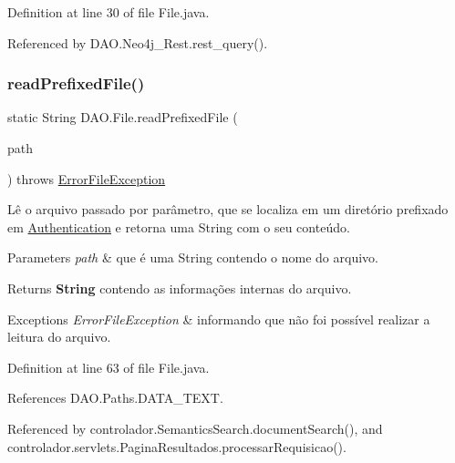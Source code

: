 Definition at line 30 of file File.\+java.



Referenced by D\+A\+O.\+Neo4j\+\_\+\+Rest.\+rest\+\_\+query().

\hypertarget{classDAO_1_1File_ae6b4d0d0dc80f0e783e78bee62c3f7fe}{}\label{classDAO_1_1File_ae6b4d0d0dc80f0e783e78bee62c3f7fe} 
\subsubsection{\texorpdfstring{read\+Prefixed\+File()}{readPrefixedFile()}}
{\footnotesize\ttfamily static String D\+A\+O.\+File.\+read\+Prefixed\+File (\begin{DoxyParamCaption}\item[{String}]{path }\end{DoxyParamCaption}) throws \hyperlink{classexcessao_1_1ErrorFileException}{Error\+File\+Exception}\hspace{0.3cm}{\ttfamily [static]}}

Lê o arquivo passado por parâmetro, que se localiza em um diretório prefixado em \hyperlink{enumDAO_1_1Authentication}{Authentication} e retorna uma String com o seu conteúdo.


\begin{DoxyParams}{Parameters}
{\em path} & que é uma String contendo o nome do arquivo. \\
\hline
\end{DoxyParams}
\begin{DoxyReturn}{Returns}
{\bfseries String} contendo as informações internas do arquivo. 
\end{DoxyReturn}

\begin{DoxyExceptions}{Exceptions}
{\em Error\+File\+Exception} & informando que não foi possível realizar a leitura do arquivo. \\
\hline
\end{DoxyExceptions}


Definition at line 63 of file File.\+java.



References D\+A\+O.\+Paths.\+D\+A\+T\+A\+\_\+\+T\+E\+XT.



Referenced by controlador.\+Semantics\+Search.\+document\+Search(), and controlador.\+servlets.\+Pagina\+Resultados.\+processar\+Requisicao().

